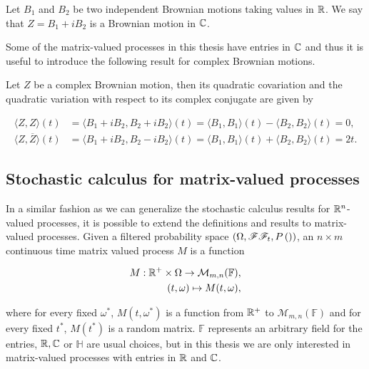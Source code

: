 \begin{example}
    Let $B_1$ and $B_2$ be two independent Brownian motions taking values in $\mathbb R$. We say that $Z = B_1 + i B_2$ is a Brownian motion in $\mathbb C$.
\end{example}

Some of the matrix-valued processes in this thesis have entries in $\mathbb C$ and thus it is useful to introduce the following result for complex Brownian motions.

\begin{theorem}
    Let $Z$ be a complex Brownian motion, then its quadratic covariation and the quadratic variation with respect to its complex conjugate are given by

    \begin{align*}
        \langle Z, Z \rangle(t) &= \langle B_1 + i B_2, B_2 + i B_2\rangle(t) = \langle B_1, B_1 \rangle(t) - \langle B_2, B_2 \rangle(t) = 0, \\ 
        \langle Z, \overline{Z} \rangle (t) &= \langle B_1 + i B_2, B_2 - i B_2\rangle(t) = \langle B_1, B_1 \rangle(t) + \langle B_2, B_2 \rangle(t) = 2t.
    \end{align*}
\end{theorem}




\subsection{Stochastic calculus for matrix-valued processes}

In a similar fashion as we can generalize the stochastic calculus results for $\mathbb R^n$-valued processes, it is possible to extend the definitions and results to matrix-valued processes. Given a filtered probability space $(\Omega, \mathscr F \mathscr F_t, P\left( ) \right)$, an $n\times m$ continuous time matrix valued process $M$ is a function

\begin{align*}
    M : \mathbb R^+ \times \Omega \to \mathcal M_{m,n}(\mathbb F),\\ 
    (t,\omega) \mapsto M(t,\omega),
\end{align*}

\noindent where for every fixed $\omega^*$, $M(t,\omega^*)$ is a function from $\mathbb R^+$ to $\mathcal M_{m,n}(\mathbb F)$ and for every fixed $t^*$, $M(t^*)$ is a random matrix. $\mathbb F$ represents an arbitrary field for the entries, $\mathbb R, \mathbb C$ or $\mathbb H$ are usual choices, but in this thesis we are only interested in matrix-valued processes with entries in $\mathbb R$ and $\mathbb C$. 

